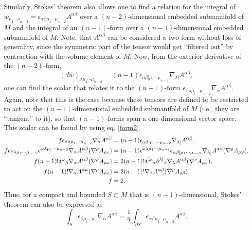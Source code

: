 \documentclass[
12pt,		%
openright,	%
twoside,  %
a4paper,			%
chapter=TITLE,		%
english,			%
french,				%
spanish,			%
brazil				%
]{USPSC-classe/USPSC}
\begin{document}
\begin{apendicesenv}
Similarly, Stokes' theorem also allows one to find a relation for the integral of $w_{\mu_1\cdots\mu_{n-2}}=\epsilon_{\alpha\beta\mu_1\cdots\mu_{n-2}}A^{\alpha\beta}$ over a $(n-2)$-dimensional embedded submanifold of $M$ and the integral of an $(n-1)$-form over a $(n-1)$-dimensional embedded submanifold of $M$. Note, that $A^{\alpha\beta}$ can be considered a two-form without loss of generality, since the symmetric part of the tensor would get ``filtered out'' by contraction with the volume element of $M$. Now, from the exterior derivative of the $(n-2)$-form,
\begin{equation}
    (dw)_{\lambda\mu_1\cdots\mu_{n-2}}=(n-1)\epsilon_{\alpha\beta[\mu_1\cdots\mu_{n-2}}\nabla_{\lambda]}A^{\alpha\beta},
\end{equation}
one can find the scalar that relates it to the $(n-1)$-form $\epsilon_{\beta\lambda\mu_1\cdots\mu_{n-2}}\nabla_{\alpha}A^{\alpha\beta}$. Again, note that this is the case because these tensors are defined to be restricted to act on the $(n-1)$-dimensional embedded submanifold of $M$ (i.e., they are ``tangent'' to it), so that $(n-1)$-forms span a one-dimensional vector space. This scalar can be found by using eq. \ref{form2},
\begin{equation}
\begin{aligned}[b]
    f\epsilon_{\beta\lambda\mu_1\cdots\mu_{n-2}}\nabla_{\alpha}A^{\alpha\beta}&=(n-1)\epsilon_{\alpha\beta[\mu_1\cdots\mu_{n-2}}\nabla_{\lambda]}A^{\alpha\beta},\\
    f\epsilon_{\beta\lambda\mu_1\cdots\mu_{n-2}}\epsilon^{\omega\lambda\mu_1\cdots\mu_{n-2}}\nabla_{\alpha}A^{\alpha\beta}(\nabla^{\rho}A_{\rho\omega})&=(n-1)\epsilon^{\omega\lambda\mu_1\cdots\mu_{n-2}}\epsilon_{\alpha\beta[\mu_1\cdots\mu_{n-2}}\nabla_{\lambda]}A^{\alpha\beta}(\nabla^{\rho}A_{\rho\omega}),\\
    f(n-1)!\delta^{\omega}\mathstrut_{\beta}\nabla_{\alpha}A^{\alpha\beta}(\nabla^{\rho}A_{\rho\omega})&=2(n-1)!\delta^{[\omega}\mathstrut_{\alpha}\delta^{\lambda]}\mathstrut_{\beta}\nabla_{\lambda}A^{\alpha\beta}(\nabla^{\rho}A_{\rho\omega}),\\
    f(n-1)!\nabla_{\alpha}A^{\alpha\omega}(\nabla^{\rho}A_{\rho\omega})&=2(n-1)!\nabla_{\alpha}A^{\alpha\beta}(\nabla^{\rho}A_{\rho\beta}),\\
    f&=2.
    \end{aligned}
\end{equation}
Thus, for a compact and bounded $S\subset M$ that is $(n-1)$-dimensional, Stokes' theorem can also be expressed as
\begin{equation}\label{stokes3}
    \int_{S}\epsilon_{\beta\mu_1\cdots\mu_{n}}\nabla_{\alpha}A^{\alpha\beta}=\frac{1}{2}\int_{\partial S}\epsilon_{\alpha\beta\mu_1\cdots\mu_{n-2}}A^{\alpha\beta}.
\end{equation}



\end{apendicesenv}
\end{document}
